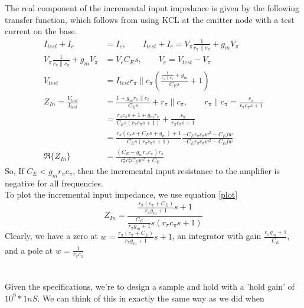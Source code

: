 \documentclass{article}
\begin{document}
\section{}
The real component of the incremental input impedance is given by the following transfer
 function, which follows from using KCL at the emitter node with a test current on the base.
\begin{align}
I_{test} + I_c &= I_e, \qquad I_{test}+I_c = V_\pi\frac{1}{r_\pi\|c_\pi} + g_mV_\pi \\
V_\pi\frac{1}{r_\pi\|c_\pi} + g_mV_\pi &= V_eC_Es ,\qquad  V_e = V_{test}-V_\pi \\
V_{test} &= I_{test}r_\pi\|c_\pi(\frac{\frac{1}{r_\pi\|c_\pi}+g_m}{C_Es}+1) \\
Z_{In} = \frac{V_{test}}{I_{test}} &= 
	\frac{1+g_m r_\pi \| c_\pi}{C_E s} + r_\pi \| c_\pi, \qquad
	r_\pi \| c_\pi = \frac{r_\pi}{r_\pi c_\pi s + 1} \\
 &= \frac{r_\pi c_\pi s+1+g_m r_\pi}{C_E s(r_\pi c_\pi s +1)} +
	\frac{r_\pi}{r_\pi c_\pi s + 1} \\
 &= \frac{r_\pi(c_\pi s+C_E s+ g_m)+1}{C_E s(r_\pi c_\pi s+1)}
	\frac{-C_E r_\pi c_\pi w^2 - C_Ejw}
	{-C_E r_\pi c_\pi w^2 - C_Ejw} \label{plot}\\
\Re \{Z_{In}\} &= \frac{(C_E - g_m r_\pi c_\pi)r_\pi}
	{r_\pi^2c_\pi^2C_Ew^2+C_E} 
\end{align}
So, If $C_E < g_m r_\pi c_\pi$, then the incremental input resistance to the amplifier is negative for all frequencies. \\
To plot the incremental input impedance, we use equation \eqref{plot} \\
$$
Z_{In} = \displaystyle\frac{\displaystyle\frac{r_\pi(c_\pi +C_E)}{r_\pi g_m + 1} s+1}
	{\displaystyle\frac{C_E}{r_\pi g_m +1} s(r_\pi c_\pi s+1)}
$$
Clearly, we have a zero at $w=\frac{r_\pi(c_\pi +C_E)}{r_\pi g_m + 1} s+1$,
 an integrator with gain $\frac{r_\pi g_m +1}{C_E} $, and a pole at $w=\frac{1}{r_\pi c_\pi}$ 

\section{}
Given the specifications, we're to design a sample and hold with a 'hold gain' of $10^9*1nS$.  We can think of this in exactly the same way as we did when     
\end{document}
